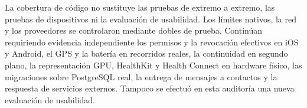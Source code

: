 La cobertura de código no sustituye las pruebas de extremo a extremo, las pruebas de dispositivos ni la evaluación de usabilidad. Los límites nativos, la red y los proveedores se controlaron mediante dobles de prueba. Continúan requiriendo evidencia independiente los permisos y la revocación efectivos en iOS y Android, el GPS y la batería en recorridos reales, la continuidad en segundo plano, la representación GPU, HealthKit y Health Connect en hardware físico, las migraciones sobre PostgreSQL real, la entrega de mensajes a contactos y la respuesta de servicios externos. Tampoco se efectuó en esta auditoría una nueva evaluación de usabilidad.

